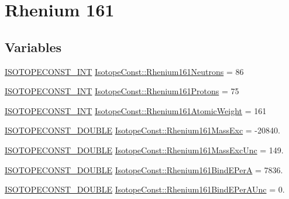 \hypertarget{group___isotope_const-_rhenium-_re161}{}\section{Rhenium 161}
\label{group___isotope_const-_rhenium-_re161}
\subsection*{Variables}
\begin{DoxyCompactItemize}
\item 
\mbox{\hyperlink{group___isotope_const-_macros_ga5f18360b3e99483a35c32d789e62621c}{I\+S\+O\+T\+O\+P\+E\+C\+O\+N\+S\+T\+\_\+\+I\+NT}} \mbox{\hyperlink{group___isotope_const-_rhenium-_re161_gabbef2c2648a8e0d8a62416048aac8286}{Isotope\+Const\+::\+Rhenium161\+Neutrons}} = 86
\item 
\mbox{\hyperlink{group___isotope_const-_macros_ga5f18360b3e99483a35c32d789e62621c}{I\+S\+O\+T\+O\+P\+E\+C\+O\+N\+S\+T\+\_\+\+I\+NT}} \mbox{\hyperlink{group___isotope_const-_rhenium-_re161_ga8485b1902efd3a436e008e900778d99b}{Isotope\+Const\+::\+Rhenium161\+Protons}} = 75
\item 
\mbox{\hyperlink{group___isotope_const-_macros_ga5f18360b3e99483a35c32d789e62621c}{I\+S\+O\+T\+O\+P\+E\+C\+O\+N\+S\+T\+\_\+\+I\+NT}} \mbox{\hyperlink{group___isotope_const-_rhenium-_re161_ga97106bac4744dde6efa18712e2ea7aef}{Isotope\+Const\+::\+Rhenium161\+Atomic\+Weight}} = 161
\item 
\mbox{\hyperlink{group___isotope_const-_macros_ga8f45a7272ce02c0b4c65c44636ed719a}{I\+S\+O\+T\+O\+P\+E\+C\+O\+N\+S\+T\+\_\+\+D\+O\+U\+B\+LE}} \mbox{\hyperlink{group___isotope_const-_rhenium-_re161_gaa279a30868a693c6e6da3ddecf6ee3dc}{Isotope\+Const\+::\+Rhenium161\+Mass\+Exc}} = -\/20840.
\item 
\mbox{\hyperlink{group___isotope_const-_macros_ga8f45a7272ce02c0b4c65c44636ed719a}{I\+S\+O\+T\+O\+P\+E\+C\+O\+N\+S\+T\+\_\+\+D\+O\+U\+B\+LE}} \mbox{\hyperlink{group___isotope_const-_rhenium-_re161_gab64644098d3863a872e8c80745fb059e}{Isotope\+Const\+::\+Rhenium161\+Mass\+Exc\+Unc}} = 149.
\item 
\mbox{\hyperlink{group___isotope_const-_macros_ga8f45a7272ce02c0b4c65c44636ed719a}{I\+S\+O\+T\+O\+P\+E\+C\+O\+N\+S\+T\+\_\+\+D\+O\+U\+B\+LE}} \mbox{\hyperlink{group___isotope_const-_rhenium-_re161_ga41ba41c134696fa6b33f1701b4af70d7}{Isotope\+Const\+::\+Rhenium161\+Bind\+E\+PerA}} = 7836.
\item 
\mbox{\hyperlink{group___isotope_const-_macros_ga8f45a7272ce02c0b4c65c44636ed719a}{I\+S\+O\+T\+O\+P\+E\+C\+O\+N\+S\+T\+\_\+\+D\+O\+U\+B\+LE}} \mbox{\hyperlink{group___isotope_const-_rhenium-_re161_gab3fb4bfe7a0f228a0c76dd978500ee93}{Isotope\+Const\+::\+Rhenium161\+Bind\+E\+Per\+A\+Unc}} = 0.

\end{DoxyCompactItemize}
